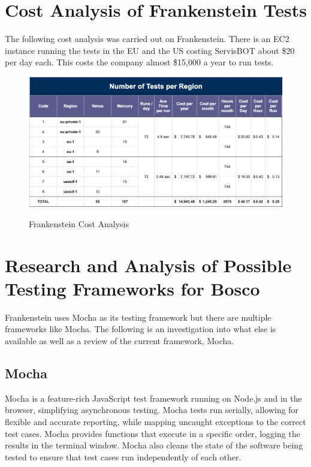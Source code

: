 \documentclass[12pt,a4paper,titlepage]{report}
\begin{document}
\section{Cost Analysis of Frankenstein Tests}

The following cost analysis was carried out on Frankenstein. There is an EC2 instance running the tests in the EU and the US costing ServisBOT about \$20 per day each. This costs the company almost \$15,000 a year to run tests.

\begin{figure}[ht]
  \centering
  {\includegraphics[width=15cm]{./diagrams/frank_cost_analysis}}
  \caption{Frankenstein Cost Analysis}
\end{figure}

\section{Research and Analysis of Possible Testing Frameworks for Bosco}

Frankenstein uses Mocha as its testing framework but there are multiple frameworks like Mocha. The following is an investigation into what else is available as well as a review of the current framework, Mocha.
\subsection{Mocha}

Mocha is a feature-rich JavaScript test framework running on Node.js and in the browser, simplifying asynchronous
testing. Mocha tests run serially, allowing for flexible and accurate reporting, while mapping uncaught
exceptions to the correct test cases. Mocha provides functions that execute in a specific order, logging the
results in the terminal window. Mocha also cleans the state of the software being tested to ensure that test
cases run independently of each other.
\end{document}

